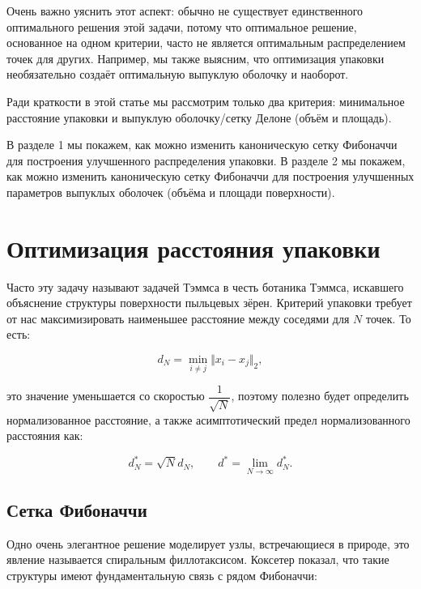 \documentclass[12pt, a4paper]{article}
\begin{document}
Очень важно уяснить этот аспект: обычно не существует единственного оптимального решения этой задачи, потому что оптимальное решение, основанное на одном критерии, часто не является оптимальным распределением точек для других. Например, мы также выясним, что оптимизация упаковки необязательно создаёт оптимальную выпуклую оболочку и наоборот.

Ради краткости в этой статье мы рассмотрим только два критерия: минимальное расстояние упаковки и выпуклую оболочку/сетку Делоне (объём и площадь).

В разделе 1 мы покажем, как можно изменить каноническую сетку Фибоначчи для построения улучшенного распределения упаковки. В разделе 2 мы покажем, как можно изменить каноническую сетку Фибоначчи для построения улучшенных параметров выпуклых оболочек (объёма и площади поверхности).

\newpage

\section{Оптимизация расстояния упаковки}

Часто эту задачу называют задачей Тэммса в честь ботаника Тэммса, искавшего объяснение структуры поверхности пыльцевых зёрен. Критерий упаковки требует от нас максимизировать наименьшее расстояние между соседями для $N$ точек. То есть:

\begin{displaymath}
    d_N = \min_{i \neq j} \Vert x_i - x_j \Vert _2,
\end{displaymath}

\noindent это значение уменьшается со скоростью $\dfrac{1}{\sqrt{N}}$, поэтому полезно будет определить нормализованное расстояние, а также асимптотический предел нормализованного расстояния как:

\begin{displaymath}
    d^*_N = \sqrt{N} d_N,
    \qquad
    d^* = \lim_{N \rightarrow \infty} d^*_N.
\end{displaymath}

\subsection{Сетка Фибоначчи}

Одно очень элегантное решение моделирует узлы, встречающиеся в природе, это явление называется спиральным филлотаксисом. Коксетер показал, что такие структуры имеют фундаментальную связь с рядом Фибоначчи:
\end{document}
